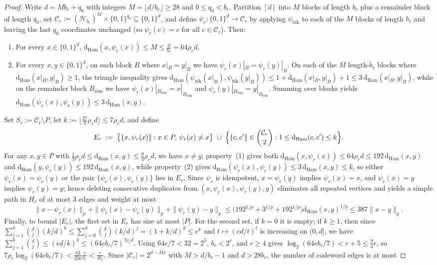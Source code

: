 \documentclass[11pt]{article}
\theoremstyle{definition}
\theoremstyle{remark}
\newcommand{\Ham}{\mathrm{Ham}}
\newcommand{\dHam}{\mathrm{d}_{\Ham}}
\begin{document}
\begin{proof}
Write $d = M b_r + q_0$ with integers $M = \lfloor d / b_r \rfloor \ge 28$ and $0 \le q_0 < b_r$. Partition $[d]$ into $M$ blocks of length $b_r$ plus a remainder block of length $q_0$, set $\mathcal{C}_r := (\mathcal{H}_{b_r})^M \times \{0, 1\}^{q_0} \subseteq \{0, 1\}^d$, and define $\psi_r : \{0, 1\}^d \to \mathcal{C}_r$ by applying $\psi_{\mathrm{blk}}$ to each of the $M$ blocks of length $b_r$ and leaving the last $q_0$ coordinates unchanged (so $\psi_r(c) = c$ for all $c \in \mathcal{C}_r$). Then:
\begin{enumerate}[label=(\arabic*),nosep]
  \item For every $x \in \{0, 1\}^d$, $\dHam(x, \psi_r(x)) \le M \le \frac{d}{b_r} = 64 \rho_r d$.
  \item For every $x, y \in \{0, 1\}^d$, on each block $B$ where $x|_B = y|_B$ we have $\psi_r(x)|_B = \psi_r(y)|_B$. On each of the $M$ length-$b_r$ blocks where $\dHam(x|_B, y|_B) \ge 1$, the triangle inequality gives $\dHam(\psi_{\mathrm{blk}}(x|_B), \psi_{\mathrm{blk}}(y|_B)) \le 1 + \dHam(x|_B, y|_B) + 1 \le 3\,\dHam(x|_B, y|_B)$, while on the remainder block $B_{\mathrm{rem}}$ we have $\psi_r(x)|_{B_{\mathrm{rem}}} = x|_{B_{\mathrm{rem}}}$ and $\psi_r(y)|_{B_{\mathrm{rem}}} = y|_{B_{\mathrm{rem}}}$. Summing over blocks yields $\dHam(\psi_r(x), \psi_r(y)) \le 3\,\dHam(x, y)$.
\end{enumerate}
Set $S_r := \mathcal{C}_r \setminus P$, let $k := \lfloor \frac{27}{4}\rho_r d \rfloor \le 7 \rho_r d$, and define
\[
E_r \;:=\; \bigl\{\{x, \psi_r(x)\} : x \in P,\, \psi_r(x) \ne x\bigr\} \;\cup\; \Bigl\{\{c, c'\} \in \binom{\mathcal{C}_r}{2} : 1 \le \dHam(c, c') \le k\Bigr\}.
\]
For any $x, y \in P$ with $\frac{1}{3}\rho_r d \le \dHam(x, y) \le \frac{9}{4}\rho_r d$, we have $x \ne y$; property~(1) gives both $\dHam(x, \psi_r(x)) \le 64 \rho_r d \le 192\,\dHam(x, y)$ and $\dHam(y, \psi_r(y)) \le 192\,\dHam(x, y)$, while property~(2) gives $\dHam(\psi_r(x), \psi_r(y)) \le 3\,\dHam(x, y) \le k$, so either $\psi_r(x) = \psi_r(y)$ or the pair $\{\psi_r(x), \psi_r(y)\}$ lies in $E_r$. Since $\psi_r$ is idempotent, $x = \psi_r(y)$ implies $\psi_r(x) = x$, and $\psi_r(x) = y$ implies $\psi_r(y) = y$; hence deleting consecutive duplicates from $(x, \psi_r(x), \psi_r(y), y)$ eliminates all repeated vertices and yields a simple path in $H_r$ of at most $3$ edges and weight at most
\[
\|x - \psi_r(x)\|_p + \|\psi_r(x) - \psi_r(y)\|_p + \|\psi_r(y) - y\|_p \le \bigl(192^{1/p} + 3^{1/p} + 192^{1/p}\bigr)\dHam(x, y)^{1/p} \le 387\|x - y\|_p.
\]
Finally, to bound $|E_r|$, the first set in $E_r$ has size at most $|P|$. For the second set, if $k = 0$ it is empty; if $k \ge 1$, then since $\sum_{j=1}^k \binom{d}{j} (k/d)^k \le \sum_{j=0}^d \binom{d}{j}(k/d)^j = (1 + k/d)^d \le e^k$ and $t \mapsto (e d / t)^t$ is increasing on $(0, d]$, we have $\sum_{j=1}^k \binom{d}{j} \le (e d / k)^k \le (64 e b_r / 7)^{7 \rho_r d}$. Using $64 e / 7 < 32 = 2^5$, $b_r < 2^r$, and $r \ge 4$ gives $\log_2(64 e b_r / 7) < r + 5 \le \frac{9}{4} r$, so $7 \rho_r \log_2(64 e b_r / 7) < \frac{63}{256} \frac{r}{b_r} < \frac{r}{4 b_r}$. Since $|\mathcal{C}_r| = 2^{d - M r}$ with $M > d/b_r - 1$ and $d > 28 b_r$, the number of codeword edges is at most

\end{proof}
\end{document}
